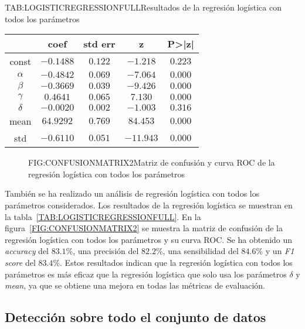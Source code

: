 \begin{table}[Resultados de la regresión logística con todos los parámetros]{TAB:LOGISTICREGRESSIONFULL}{Resultados de la regresión logística con todos los parámetros}
    \begin{tabular}{|c|c|c|c|c|}
        \hline
        & coef & std err & z & P>|z| \\
        \hline
        const & $-0.1488$ & $0.122$ & $-1.218$ & $0.223$ \\
        $\alpha$ & $-0.4842$ & $0.069$ & $-7.064$ & $0.000$ \\
        $\beta$ & $-0.3669$ & $0.039$ & $-9.426$ & $0.000$ \\
        $\gamma$ & $0.4641$ & $0.065$ & $7.130$ & $0.000$ \\
        $\delta$ & $-0.0020$ & $0.002$ & $-1.003$ & $0.316$ \\
        mean & $64.9292$ & $0.769$ & $84.453$ & $0.000$ \\
        std & $-0.6110$ & $0.051$ & $-11.943$ & $0.000$ \\
        \hline
    \end{tabular}
\end{table}

\begin{figure}[Matriz de confusión y curva ROC de la regresión logística con todos los parámetros]{FIG:CONFUSIONMATRIX2}{Matriz de confusión y curva ROC de la regresión logística con todos los parámetros}
     \quad
\end{figure}

También se ha realizado un análisis de regresión logística con todos los parámetros considerados. Los resultados de la regresión logística se muestran en la tabla~\ref{TAB:LOGISTICREGRESSIONFULL}.
En la figura~\ref{FIG:CONFUSIONMATRIX2} se muestra la matriz de confusión de la regresión logística con todos los parámetros y su curva \ac{ROC}. Se ha obtenido un \textit{accuracy} del $83.1\%$, una precisión del $82.2\%$, una sensibilidad del $84.6\%$ y un \textit{F1 score} del $83.4\%$. Estos resultados indican que la regresión logística con todos los parámetros es más eficaz que la regresión logística que solo usa los parámetros $\delta$ y \textit{mean}, ya que se obtiene una mejora en todas las métricas de evaluación.

\subsection{Detección sobre todo el conjunto de datos}\label{SUBSEC:DETECCIONDATASET}

